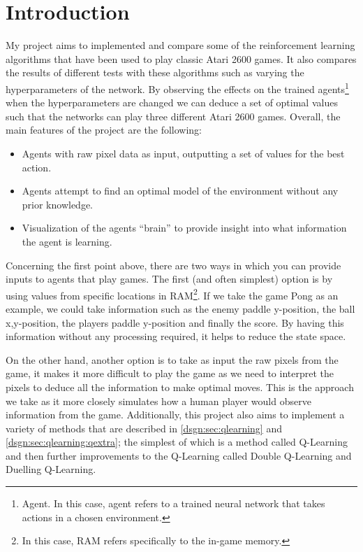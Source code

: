 \chapter{Introduction}
\label{cha:intro}
My project aims to implemented and compare some of the reinforcement learning algorithms that have been used to play classic Atari 2600 games. It also compares the results of different tests with these algorithms such as varying the hyperparameters of the network. By observing the effects on the trained agents\footnote{Agent. In this case, agent refers to a trained neural network that takes actions in a chosen environment.} when the hyperparameters are changed we can deduce a set of optimal values such that the networks can play three different Atari 2600 games. Overall, the main features of the project are the following:
\begin{itemize}
  \item Agents with raw pixel data as input, outputting a set of values for the best action.
  \item Agents attempt to find an optimal model of the environment without any prior knowledge.
  \item Visualization of the agents ``brain'' to provide insight into what information the agent is learning.
\end{itemize}

Concerning the first point above, there are two ways in which you can provide inputs to agents that play games. The first (and often simplest) option is by using values from specific locations in RAM\footnote{In this case, RAM refers specifically to the in-game memory.}. If we take the game Pong as an example, we could take information such as the enemy paddle y-position, the ball x,y-position, the players paddle y-position and finally the score. By having this information without any processing required, it helps to reduce the state space.

On the other hand, another option is to take as input the raw pixels from the game, it makes it more difficult to play the game as we need to interpret the pixels to deduce all the information to make optimal moves. This is the approach we take as it more closely simulates how a human player would observe information from the game. Additionally, this project also aims to implement a variety of methods that are described in \ref{dsgn:sec:qlearning} and \ref{dsgn:sec:qlearning:qextra}; the simplest of which is a method called Q-Learning and then further improvements to the Q-Learning called Double Q-Learning and Duelling Q-Learning.

